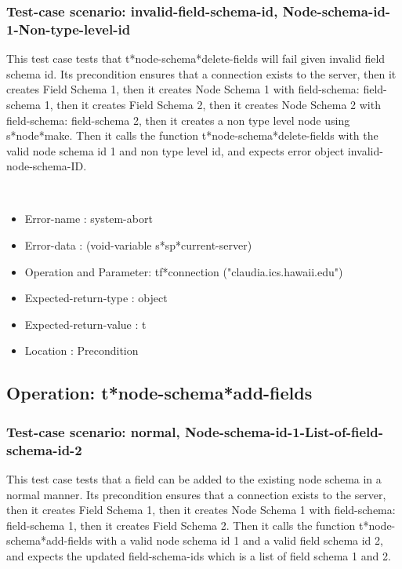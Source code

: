 \subsubsection {Test-case scenario: invalid-field-schema-id, Node-schema-id-1-Non-type-level-id}


This test case tests that t*node-schema*delete-fields will fail given invalid field schema id.
Its precondition ensures that a connection exists to the server, then it creates Field Schema 1, then it creates Node Schema 1 with field-schema: field-schema 1, then it creates Field Schema 2, then it creates Node Schema 2 with field-schema: field-schema 2, then it creates a non type level node using s*node*make.
Then it calls the function t*node-schema*delete-fields  with the valid node schema id 1 and non type level id, and expects error object invalid-node-schema-ID.



\
\begin {itemize}
\item 	Error-name             : system-abort
\item Error-data             : (void-variable s*sp*current-server)
\item Operation and Parameter: tf*connection ("claudia.ics.hawaii.edu")
\item Expected-return-type   : object
\item Expected-return-value  : t
\item Location               : Precondition



\end {itemize}
\subsection {Operation: t*node-schema*add-fields}
\subsubsection {Test-case scenario: normal, Node-schema-id-1-List-of-field-schema-id-2}


This test case tests that a field can be added to the existing node schema in a normal manner.
Its precondition ensures that a connection exists to the server, then it creates Field Schema 1, then it creates Node Schema 1 with field-schema: field-schema 1, then it creates Field Schema 2.
Then it calls the function t*node-schema*add-fields  with a valid node schema id 1 and a valid field schema id 2, and expects the updated field-schema-ids which is a list of field schema 1 and 2.



